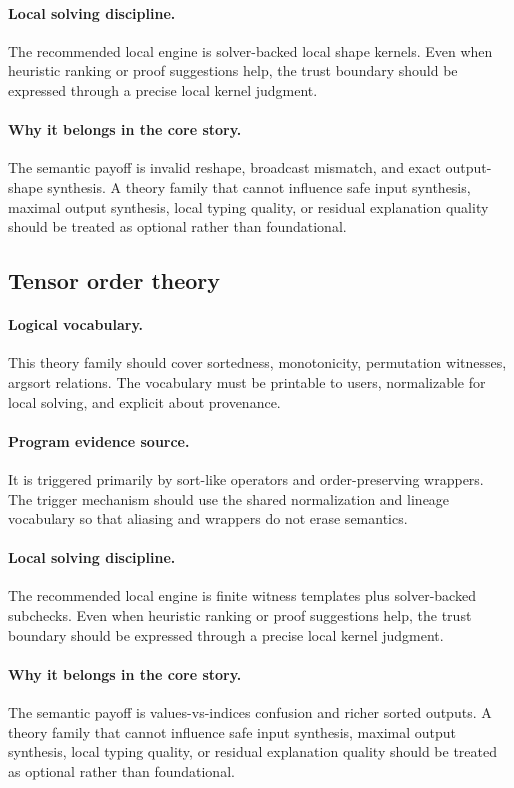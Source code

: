 \documentclass[11pt]{report}
\theoremstyle{definition}
\theoremstyle{plain}
\begin{document}
\paragraph{Local solving discipline.}
The recommended local engine is solver-backed local shape kernels. Even when heuristic ranking or
proof suggestions help, the trust boundary should be expressed through a
precise local kernel judgment.

\paragraph{Why it belongs in the core story.}
The semantic payoff is invalid reshape, broadcast mismatch, and exact output-shape synthesis. A theory family that cannot influence safe
input synthesis, maximal output synthesis, local typing quality, or residual
explanation quality should be treated as optional rather than foundational.

\subsection{Tensor order theory}

\paragraph{Logical vocabulary.}
This theory family should cover sortedness, monotonicity, permutation witnesses, argsort relations. The vocabulary must be printable to
users, normalizable for local solving, and explicit about provenance.

\paragraph{Program evidence source.}
It is triggered primarily by sort-like operators and order-preserving wrappers. The trigger mechanism should use the
shared normalization and lineage vocabulary so that aliasing and wrappers do
not erase semantics.

\paragraph{Local solving discipline.}
The recommended local engine is finite witness templates plus solver-backed subchecks. Even when heuristic ranking or
proof suggestions help, the trust boundary should be expressed through a
precise local kernel judgment.

\paragraph{Why it belongs in the core story.}
The semantic payoff is values-vs-indices confusion and richer sorted outputs. A theory family that cannot influence safe
input synthesis, maximal output synthesis, local typing quality, or residual
explanation quality should be treated as optional rather than foundational.
\end{document}
